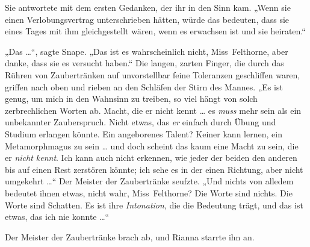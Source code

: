 Sie antwortete mit dem ersten Gedanken, der ihr in den Sinn kam.
„Wenn sie einen Verlobungsvertrag unterschrieben hätten, würde das bedeuten, dass sie eines Tages mit ihm gleichgestellt wären, wenn es erwachsen ist und sie heiraten.“

„Das …“, sagte Snape.
„Das ist es wahrscheinlich nicht, Miss~Felthorne, aber danke, dass sie es versucht haben.“ Die langen, zarten Finger, die durch das Rühren von Zaubertränken auf unvorstellbar feine Toleranzen geschliffen waren, griffen nach oben und rieben an den Schläfen der Stirn des Mannes.
„Es ist genug, um mich in den Wahnsinn zu treiben, so viel hängt von solch zerbrechlichen Worten ab. Macht, die er nicht kennt … es \emph{muss} mehr sein als ein unbekannter Zauberspruch. Nicht etwas, das \emph{er} einfach durch Übung und Studium erlangen könnte. Ein angeborenes Talent? Keiner kann lernen, ein Metamorphmagus zu sein … und doch scheint das kaum eine Macht zu sein, die er \emph{nicht kennt}. Ich kann auch nicht erkennen, wie jeder der beiden den anderen bis auf einen Rest zerstören könnte; ich sehe es in der einen Richtung, aber nicht umgekehrt …“ Der Meister der Zaubertränke seufzte.
„Und nichts von alledem bedeutet ihnen etwas, nicht wahr, Miss~Felthorne? Die Worte sind nichts. Die Worte sind Schatten. Es ist ihre \emph{Intonation}, die die Bedeutung trägt, und das ist etwas, das ich nie konnte …“

Der Meister der Zaubertränke brach ab, und Rianna starrte ihn an.

